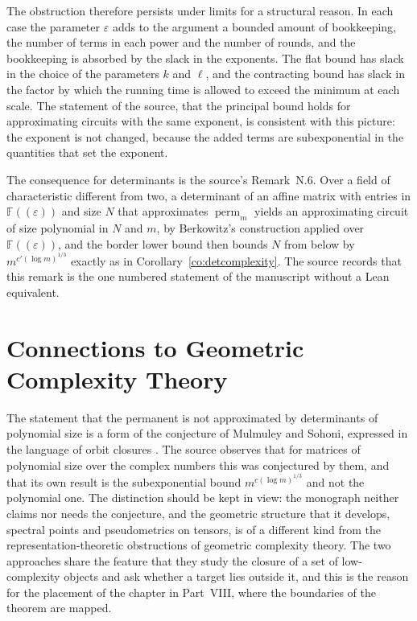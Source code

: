 \documentclass[11pt,letterpaper]{report}
\theoremstyle{plain}
\theoremstyle{definition}
\theoremstyle{remark}
\DeclareMathOperator{\perm}{perm}
\begin{document}
The obstruction therefore persists under limits for a structural reason. In each case the parameter $\varepsilon$ adds to the argument a bounded amount of bookkeeping, the number of terms in each power and the number of rounds, and the bookkeeping is absorbed by the slack in the exponents. The flat bound has slack in the choice of the parameters $k$ and $\ell$, and the contracting bound has slack in the factor by which the running time is allowed to exceed the minimum at each scale. The statement of the source, that the principal bound holds for approximating circuits with the same exponent, is consistent with this picture: the exponent is not changed, because the added terms are subexponential in the quantities that set the exponent.

The consequence for determinants is the source's Remark~N.6. Over a field of characteristic different from two, a determinant of an affine matrix with entries in $\mathbb F((\varepsilon))$ and size $N$ that approximates $\perm_m$ yields an approximating circuit of size polynomial in $N$ and $m$, by Berkowitz's construction applied over $\mathbb F((\varepsilon))$, and the border lower bound then bounds $N$ from below by $m^{c'(\log m)^{1/3}}$ exactly as in Corollary~\ref{co:detcomplexity}. The source records that this remark is the one numbered statement of the manuscript without a Lean equivalent.

\section{Connections to Geometric Complexity Theory}

The statement that the permanent is not approximated by determinants of polynomial size is a form of the conjecture of Mulmuley and Sohoni, expressed in the language of orbit closures \cite{MulmuleySohoni2001,MulmuleySohoni2008}. The source observes that for matrices of polynomial size over the complex numbers this was conjectured by them, and that its own result is the subexponential bound $m^{c(\log m)^{1/3}}$ and not the polynomial one. The distinction should be kept in view: the monograph neither claims nor needs the conjecture, and the geometric structure that it develops, spectral points and pseudometrics on tensors, is of a different kind from the representation-theoretic obstructions of geometric complexity theory. The two approaches share the feature that they study the closure of a set of low-complexity objects and ask whether a target lies outside it, and this is the reason for the placement of the chapter in Part~VIII, where the boundaries of the theorem are mapped.
\end{document}
